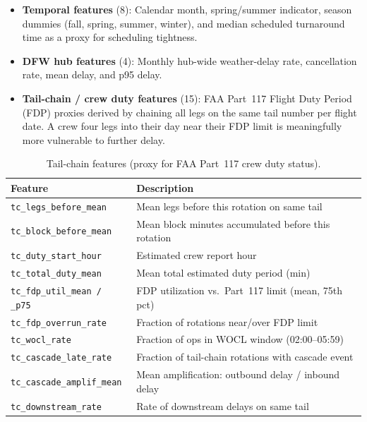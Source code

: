 \documentclass[11pt, twoside]{article}
\begin{document}
\begin{itemize}[leftmargin=*, itemsep=3pt, topsep=3pt]
  \item \textbf{Temporal features} (8): Calendar month, spring/summer indicator,
        season dummies (fall, spring, summer, winter), and median
        scheduled turnaround time as a proxy for scheduling tightness.
  \item \textbf{DFW hub features} (4): Monthly hub-wide weather-delay rate,
        cancellation rate, mean delay, and p95 delay.
  \item \textbf{Tail-chain / crew duty features} (15): FAA Part~117 Flight Duty
        Period (FDP) proxies derived by chaining all legs on the same tail
        number per flight date.  A crew four legs into their day near their FDP
        limit is meaningfully more vulnerable to further delay.
\end{itemize}

\begin{table}[!htbp]
\centering
\caption{Tail-chain features (proxy for FAA Part~117 crew duty status).}
\label{tab:tailchain_features}
\begin{tabular}{lL{6.5cm}}
\toprule
Feature & Description \\
\midrule
\texttt{tc\_legs\_before\_mean} & Mean legs before this rotation on same tail \\
\texttt{tc\_block\_before\_mean} & Mean block minutes accumulated before this rotation \\
\texttt{tc\_duty\_start\_hour} & Estimated crew report hour \\
\texttt{tc\_total\_duty\_mean} & Mean total estimated duty period (min) \\
\texttt{tc\_fdp\_util\_mean / \_p75} & FDP utilization vs.\ Part~117 limit (mean, 75th pct) \\
\texttt{tc\_fdp\_overrun\_rate} & Fraction of rotations near/over FDP limit \\
\texttt{tc\_wocl\_rate} & Fraction of ops in WOCL window (02:00--05:59) \\
\texttt{tc\_cascade\_late\_rate} & Fraction of tail-chain rotations with cascade event \\
\texttt{tc\_cascade\_amplif\_mean} & Mean amplification: outbound delay / inbound delay \\
\texttt{tc\_downstream\_rate} & Rate of downstream delays on same tail \\
\bottomrule
\end{tabular}
\end{table}
\end{document}
